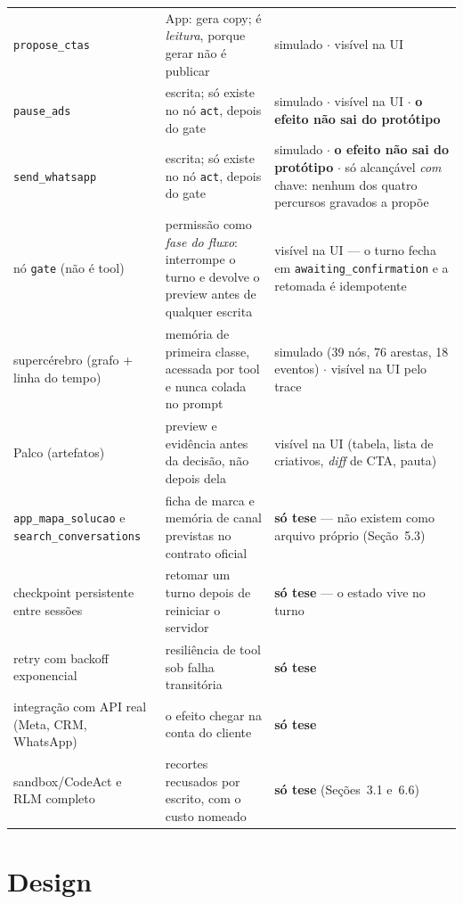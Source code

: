 \documentclass[10pt,twocolumn]{article}
\newcommand{\code}[1]{\texttt{\footnotesize #1}}
\begin{document}
\begin{table}[t]
\begin{tabular}{@{}>{\raggedright\arraybackslash}p{32mm}>{\raggedright\arraybackslash}p{70mm}>{\raggedright\arraybackslash}p{61mm}@{}}
\code{propose\_ctas}         & App: gera copy; é \emph{leitura}, porque gerar não é publicar & simulado $\cdot$ visível na UI \\
\code{pause\_ads}            & escrita; só existe no nó \code{act}, depois do gate & simulado $\cdot$ visível na UI $\cdot$ \textbf{o efeito não sai do protótipo} \\
\code{send\_whatsapp}        & escrita; só existe no nó \code{act}, depois do gate & simulado $\cdot$ \textbf{o efeito não sai do protótipo} $\cdot$ só alcançável \emph{com} chave: nenhum dos quatro percursos gravados a propõe \\
\midrule
nó \code{gate} (não é tool)  & permissão como \emph{fase do fluxo}: interrompe o turno e devolve o preview antes de qualquer escrita & visível na UI --- o turno fecha em \code{awaiting\_confirmation} e a retomada é idempotente \\
supercérebro (grafo + linha do tempo) & memória de primeira classe, acessada por tool e nunca colada no prompt & simulado (39 nós, 76 arestas, 18 eventos) $\cdot$ visível na UI pelo trace \\
Palco (artefatos)            & preview e evidência antes da decisão, não depois dela & visível na UI (tabela, lista de criativos, \emph{diff} de CTA, pauta) \\
\midrule
\code{app\_mapa\_solucao} e \code{search\_conversations} & ficha de marca e memória de canal previstas no contrato oficial & \textbf{só tese} --- não existem como arquivo próprio (Seção~5.3) \\
checkpoint persistente entre sessões & retomar um turno depois de reiniciar o servidor & \textbf{só tese} --- o estado vive no turno \\
retry com backoff exponencial & resiliência de tool sob falha transitória & \textbf{só tese} \\
integração com API real (Meta, CRM, WhatsApp) & o efeito chegar na conta do cliente & \textbf{só tese} \\
sandbox/CodeAct e RLM completo & recortes recusados por escrito, com o custo nomeado & \textbf{só tese} (Seções~3.1 e~6.6) \\
\bottomrule
\end{tabular}
\end{table}

\section{Design}
\end{document}
